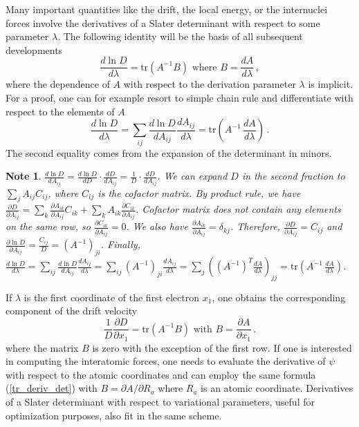 \documentclass[aip,jcp,reprint,floatfix,onecolumn]{revtex4-1}
\newtheorem*{note}{Note}
\def\tr{\text{tr}}
\def\Al{B}
\def\wdet{D}
\begin{document}
Many important quantities like the drift, the local energy, or the internuclei forces involve the derivatives  of a Slater determinant with respect to some parameter $\lambda$.
The following identity will be the basis of all subsequent developments
\begin{equation}
\frac{ d\ln D}{d\lambda} = \tr( A^{-1} B) \text{ \ \ where \ } B = \frac{dA}{d\lambda}\,,
\label{derivtrace}
\end{equation}
where the dependence of $A$ with respect to the derivation parameter $\lambda$ is implicit.
For a proof, one can for example resort to simple chain rule and differentiate  with respect to the elements of $A$
\begin{equation}
\frac{d\ln D}{d\lambda}=\sum_{ij} \frac{d\ln D}{d A_{ij}} \frac{d A_{ij}}{d\lambda} = \tr(A^{-1}\,\frac{d A}{d\lambda})\,.
\label{tr_deriv_det}
\end{equation}
The second equality comes from the expansion of the determinant in minors.

\begin{note}
$\frac{d \ln D}{dA_{ij}} = \frac{d \ln D}{d D}\cdot \frac{d D}{d A_{ij}} = \frac{1}{D}\cdot \frac{d D}{d A_{ij}}$.
We can expand $D$ in the second fraction to $\sum\limits_j A_{ij}C_{ij}$, where $C_{ij}$ is the cofactor matrix.
By product rule, we have
$\frac{\partial D}{\partial A_{ij}}
= \sum\limits_k \frac{\partial A_{ik}}{\partial A_{ij}}C_{ik} + \sum\limits_k A_{ik} \frac{\partial C_{ik}}{\partial A_{ij}}$.
Cofactor matrix does not contain any elements on the same row, so $\frac{\partial C_{ik}}{\partial A_{ij}} = 0$.
We also have $\frac{\partial A_{ik}}{\partial A_{ij}} = \delta_{kj}$.
Therefore, $\frac{\partial D}{\partial A_{ij}} = C_{ij}$ and $\frac{\partial \ln D}{\partial A_{ij}} = \frac{C_{ij}}{D} = (A^{-1})_{ji}$.
Finally,
$\frac{d\ln D}{d\lambda}
= \sum_{ij} \frac{d\ln D}{d A_{ij}} \frac{d A_{ij}}{d\lambda}
= \sum_{ij} (A^{-1})_{ji} \frac{d A_{ij}}{d\lambda}
= \sum_{j} \left((A^{-1})^T \frac{d A}{d\lambda}\right)_{jj}
= \tr(A^{-1}\,\frac{d A}{d\lambda})$.
\end{note}

If $\lambda$ is the first coordinate of the first electron $x_1$, one obtains the corresponding  component of the drift velocity
\begin{equation}
\frac{1}{\wdet} \frac{\partial \wdet}{\partial x_1} =  \tr (A^{-1} B) \text{\  \ with \ } \Al = \frac{\partial  A}{\partial x_1}\,.
\label{drift11}
\end{equation}
where the matrix $B$ is zero with the exception of the first row.
If one is interested in computing the interatomic forces, one needs to evaluate the derivative of $\psi$ with respect to the
atomic coordinates and can employ the same formula (\ref{tr_deriv_det}) with $\Al = {\partial  A}/{\partial R_a}$ where $R_a$ is an atomic coordinate.
Derivatives of a Slater determinant with respect to  variational parameters, useful for optimization purposes, also fit in the same scheme.
\end{document}
